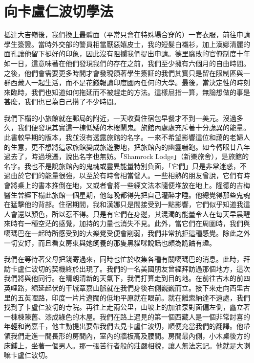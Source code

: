 \chapter{向卡盧仁波切學法}

抵達大吉嶺後，我們換上最體面（平常只會在特殊場合穿的）一套衣服，前往申請學生簽證。當時外交部的警員相當厭惡嬉皮士，我的短髮白襯衫，加上漢娜清麗的面孔讓他留下挺好的印象，因此沒有阻攔我們提出申請。德里腐敗的官僚制度十年如一日，這意味著在他們發現我們的存在之前，我們至少擁有六個月的自由時間。之後，他們會需要更多時間才會發現領著學生簽証的我們其實只是留在限制區與一群西藏人一起生活，而不是花錢報讀印度國內任何的大學。最後，當決定性的時刻來臨時，我們也知道如何拖延而不被趕走的方法。這樣屈指一算，無論想做的事是甚麼，我們也已為自己攢了不少時間。

我們下榻的小旅館就在郵局的附近，一天收費住宿包早餐才不到一美元。沒過多久，我們便發現其實這一棟低矮的木樓鬧鬼。旅館內處處充斥著十分詭異的能量。此書較早期的版本，我並沒有透露旅館的名字。一來不希望影響這位和藹的老婦人的生意，更不想將這家旅館變成旅遊勝地，把旅館內的幽靈嚇跑。如今轉眼廿八年過去了，時過境遷，說出名字也無妨。「Shamrock
Lodge」（新樂旅舍），是旅館的名字。我也不是說旅館內的鬼魂或靈異能量特別負面，「它們」只是非常迷惑，不過由於它們的能量很強，以至於有時會相當惱人。一些相熟的朋友曾說，它們有時會將桌上的書本推倒在地，又或者會將一些經文法本隨便堆放在地上。隆德的吉梅醫生曾經下榻此旅館一個星期，他每晚都得先把自己灌醉才睡。他總覺得那些鬼魂在猛擊他的背部。住宿期間，我和漢娜只是間接受到一點影響，它們似乎知道我這人會還以顏色，所以惹不得。只是有它們在身邊，其混濁的能量令人在每天早晨醒來時有一種空茫的感覺，加持的力量也消失不見。此外，當它們在周圍時，我們與噶瑪巴在一起時所感受到的大樂覺受便會削弱，我們非常抗拒這種感覺。除此之外一切安好，而且看女房東與她飼養的那隻黑貓咪說話也頗為詭譎有趣。

我們在等待著父母把錢寄過來，同時也忙於收集各種有關噶瑪巴的消息。此時，拜訪卡盧仁波切的契機終於出現了。我們的一名美國朋友曾經拜訪過那個地方，這次我們將與他同行。在晴朗清新的天氣下，我們打算走到目的地。在前往古木的前四英哩路，綿延起伏的干城章嘉山脈就在我們身後右側巍巍而立。接下來走向西里古里的五英哩路，印度一片片遼闊的低地平原就在眼前。就在離索納達不遠處，我們找到了卡盧仁波切的寺院。再往上走兩公里，山坡上的加油泵對面偏左側，矗立著一棟棟陳舊、漆成綠色的木屋。我們在路上遇見的第一個西藏人是一個非常討喜的年輕和尚嘉千，他主動提出要帶我們去見卡盧仁波切，順便充當我們的翻譯。他帶領我們走進一間長形的房間內，室內的牆板高及腰間。房間最內側，小木桌後方的床鋪上，坐著一個男人。那一張苦行者般的莊嚴相貌，讓人無法忘記。他就是大喇嘛卡盧仁波切。

